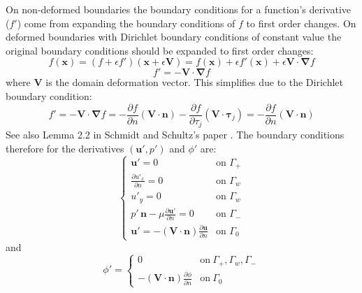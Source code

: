 \documentclass[12pt, a4paper]{article}
\begin{document}
    On non-deformed boundaries the boundary conditions for a function's derivative ($f'$) come from expanding the boundary conditions of $f$ to first order changes. On deformed boundaries with Dirichlet boundary conditions of constant value the original boundary conditions should be expanded to first order changes:
    \begin{equation}
    f(\mathbf{x}) = (f + \epsilon f') (\mathbf{x} + \epsilon \mathbf{V}) =
    f(\mathbf{x}) + \epsilon f'(\mathbf{x}) + \epsilon \mathbf{V \cdot} \boldsymbol{\nabla} f
    \end{equation}
    \begin{equation}
    f' = - \mathbf{V \cdot} \boldsymbol{\nabla} f
    \end{equation}
    where $\mathbf{V}$ is the domain deformation vector. This simplifies due to the Dirichlet boundary condition:
    \begin{equation}
    f' = - \mathbf{V \cdot} \boldsymbol{\nabla} f = 
    - \frac{\partial f}{\partial n} (\mathbf{V \cdot n}) -
    \frac{\partial f}{\partial \tau_j} (\mathbf{V \cdot} \boldsymbol{\tau}_j) = 
    - \frac{\partial f}{\partial n} (\mathbf{V \cdot n})
    \end{equation}
    See also Lemma 2.2 in Schmidt and Schultz's paper \cite{Schmidt_1}. The boundary conditions therefore for the derivatives $(\mathbf{u'}, p')$ and $\phi'$ are:
    \begin{equation} \label{flow_der_boundary_conditions}
    \begin{cases}
    \mathbf{u'} = 0 & \text{on } \Gamma_+ \\
    \frac{\partial u'_x}{\partial n} = 0 & \text{on } \Gamma_w \\
    u'_y = 0  & \text{on } \Gamma_w \\
    p' \, \mathbf{n} - \mu \frac{\partial \mathbf{u'}}{\partial n} = 0 & \text{on } \Gamma_- \\
    \mathbf{u'} = - (\mathbf{V \cdot n}) \frac{\partial \mathbf{u}}{\partial n} & \text{on } \Gamma_0
    \end{cases}
    \end{equation}
    and
    \begin{equation} \label{phi_der_boundary_conditons}
    \phi' = \begin{cases}
    0	 &	\text{on}\ \Gamma_+, \Gamma_w, \Gamma_- \\
    - (\mathbf{V \cdot n}) \frac{\partial \phi}{\partial n}	 &	\text{on}\ \Gamma_0
    \end{cases}
    \end{equation}
    
\end{document}
